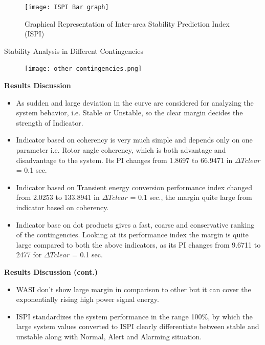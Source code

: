 \documentclass [xcolor=svgnames, t] {beamer}
\begin{document}
\begin{frame}
\begin{figure}
    \centering
    \texttt{[image: ISPI Bar graph]}
\caption{Graphical Representation of Inter-area Stability Prediction Index (ISPI)}
\end{figure}
\end{frame}

	\begin{frame}{Stability Analysis in Different Contingencies
}
\begin{figure}[H]
	 \centering
	\texttt{[image: other contingencies.png]}
	
\end{figure}
\end{frame}

\begin{frame}{\textbf{Results Discussion}}
\begin{itemize} \justifying 
	\item As sudden and large deviation in the curve are considered for analyzing the system behavior, i.e. Stable or Unstable, so the clear margin decides the strength of Indicator.
\item Indicator based on coherency is very much simple and depends only on one parameter i.e.  Rotor angle coherency,  which is both advantage and disadvantage to the system. Its PI changes from 1.8697 to 66.9471 in $\Delta Tclear$ = 0.1 sec.
\item Indicator based on Transient energy conversion performance index changed from 2.0253 to 133.8941 in $\Delta Tclear$ = 0.1 sec., the margin quite large from indicator based on coherency.
\item Indicator base on dot products gives a fast, coarse and conservative ranking of the contingencies. Looking at its performance index the margin is quite large compared to both the above indicators, as its PI changes from 9.6711 to 2477  for $\Delta Tclear$ = 0.1 sec.

\end{itemize}
\end{frame}

\begin{frame}{\textbf{Results Discussion (cont.)}}
\begin{itemize} \justifying
\item WASI don’t show large margin in comparison to other but it can cover the exponentially rising high power signal energy.
\item ISPI standardizes the system performance in the range 100\%, by which the large system values converted to ISPI clearly differentiate between stable and unstable along with Normal, Alert and Alarming situation.

\end{itemize}
\end{frame}
\end{document}
